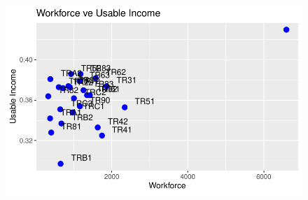 \documentclass[
  11pt,
  a4paper,
  DIV=11,
  numbers=noendperiod]{scrartcl}
\begin{document}
\begin{figure}[H]

{\centering \includegraphics{analysis_files/figure-pdf/unnamed-chunk-13-1.pdf}

}

\end{figure}
\end{document}
